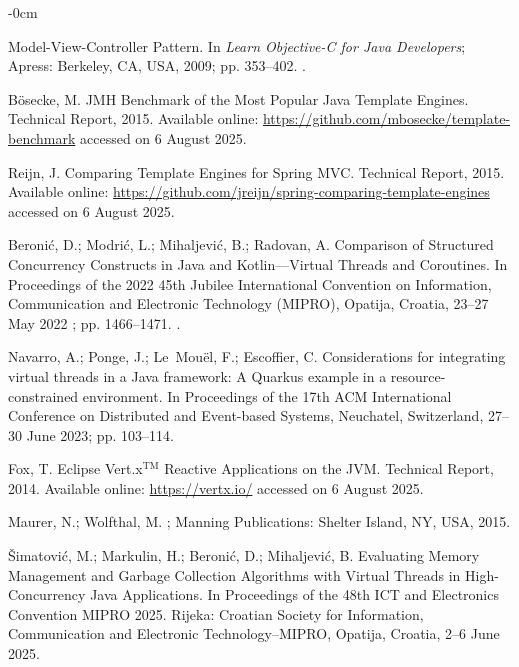 \documentclass[software,article,accept,pdftex,moreauthors]{Definitions/mdpi}
\begin{document}
\begin{adjustwidth}{-\extralength}{0cm}
\begin{thebibliography}{999}
Model-View-Controller Pattern.
\newblock In {\em Learn Objective-C for Java Developers}; Apress: Berkeley, CA, USA, 
   2009; pp. 353--402.
.

Bösecke, M.
\newblock JMH Benchmark of the Most Popular Java Template Engines.
\newblock Technical Report, 2015.
  Available online: \url{https://github.com/mbosecke/template-benchmark} accessed on 6 August 2025.


Reijn, J.
\newblock Comparing Template Engines for Spring MVC.
\newblock Technical Report, 2015.
 Available online: \url{https://github.com/jreijn/spring-comparing-template-engines} accessed on 6 August 2025.

Beronić, D.; Modrić, L.; Mihaljević, B.; Radovan, A.
\newblock Comparison of Structured Concurrency Constructs in Java and Kotlin---Virtual Threads and Coroutines.
\newblock In Proceedings of the 2022 45th Jubilee International Convention on
  Information, Communication and Electronic Technology (MIPRO), Opatija, Croatia, 23--27 May 2022
; pp. 1466--1471.
.

Navarro, A.; Ponge, J.; Le~Mou{\"e}l, F.; Escoffier, C.
\newblock Considerations for integrating virtual threads in a Java framework: A
  Quarkus example in a resource-constrained environment.
\newblock In Proceedings of the 17th ACM International
  Conference on Distributed and Event-based Systems, Neuchatel, Switzerland, 27--30 June 2023; pp. 103--114.

Fox, T.
\newblock Eclipse Vert.x$^{\text{TM}}$ Reactive Applications on the JVM.
\newblock Technical Report, 2014. Available online: \url{https://vertx.io/} accessed on 6 August 2025.

Maurer, N.; Wolfthal, M.
; Manning Publications: Shelter Island, NY, USA, 2015.


{\v{S}}imatovi{\'c}, M.; Markulin, H.; Beroni{\'c}, D.; Mihaljevi{\'c}, B.
\newblock Evaluating Memory Management and Garbage Collection Algorithms with
  Virtual Threads in High-Concurrency Java Applications.
\newblock In Proceedings of the 48th ICT and Electronics Convention MIPRO 2025. Rijeka: Croatian Society for Information, Communication and Electronic Technology–MIPRO, Opatija, Croatia, 2--6 June 2025. 



\end{thebibliography}
\end{adjustwidth}
\end{document}
